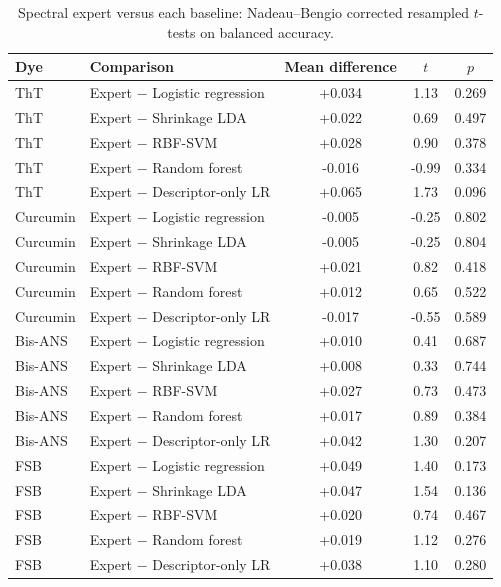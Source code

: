 \begin{table}[!htbp]
\centering\scriptsize
\caption{Spectral expert versus each baseline: Nadeau--Bengio corrected resampled $t$-tests on balanced accuracy.}\label{tab:s_ttests}
\begin{tabular}{llccc}
\toprule
\textbf{Dye} & \textbf{Comparison} & \textbf{Mean difference} & \textbf{$t$} & \textbf{$p$} \\
\midrule
ThT & Expert $-$ Logistic regression & +0.034 & 1.13 & 0.269 \\
ThT & Expert $-$ Shrinkage LDA & +0.022 & 0.69 & 0.497 \\
ThT & Expert $-$ RBF-SVM & +0.028 & 0.90 & 0.378 \\
ThT & Expert $-$ Random forest & -0.016 & -0.99 & 0.334 \\
ThT & Expert $-$ Descriptor-only LR & +0.065 & 1.73 & 0.096 \\
Curcumin & Expert $-$ Logistic regression & -0.005 & -0.25 & 0.802 \\
Curcumin & Expert $-$ Shrinkage LDA & -0.005 & -0.25 & 0.804 \\
Curcumin & Expert $-$ RBF-SVM & +0.021 & 0.82 & 0.418 \\
Curcumin & Expert $-$ Random forest & +0.012 & 0.65 & 0.522 \\
Curcumin & Expert $-$ Descriptor-only LR & -0.017 & -0.55 & 0.589 \\
Bis-ANS & Expert $-$ Logistic regression & +0.010 & 0.41 & 0.687 \\
Bis-ANS & Expert $-$ Shrinkage LDA & +0.008 & 0.33 & 0.744 \\
Bis-ANS & Expert $-$ RBF-SVM & +0.027 & 0.73 & 0.473 \\
Bis-ANS & Expert $-$ Random forest & +0.017 & 0.89 & 0.384 \\
Bis-ANS & Expert $-$ Descriptor-only LR & +0.042 & 1.30 & 0.207 \\
FSB & Expert $-$ Logistic regression & +0.049 & 1.40 & 0.173 \\
FSB & Expert $-$ Shrinkage LDA & +0.047 & 1.54 & 0.136 \\
FSB & Expert $-$ RBF-SVM & +0.020 & 0.74 & 0.467 \\
FSB & Expert $-$ Random forest & +0.019 & 1.12 & 0.276 \\
FSB & Expert $-$ Descriptor-only LR & +0.038 & 1.10 & 0.280 \\
\bottomrule
\end{tabular}
\end{table}

